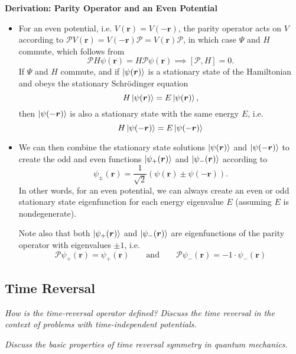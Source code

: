 \documentclass[11pt, a4paper]{article}
\newcommand{\eqtext}[1]{\qquad \text{#1} \qquad}
\newcommand{\Schro}{Schr\"{o}dinger\xspace}
\newcommand{\Ham}{Hamiltonian\xspace}
\renewcommand{\vec}[1]{\bm{#1}}  %
\renewcommand{\r}{\vec{r}}  %
\newcommand{\Par}{\mathcal{P}}  %
\newcommand{\p}{\psi}  %
\renewcommand{\P}{\Psi}  %
\renewcommand{\k}[1]{\ket{#1}}
\begin{document}
\textbf{Derivation: Parity Operator and an Even Potential}
\begin{itemize}
    \item For an even potential, i.e. $ V(\r) = V(-\r) $, the parity operator acts on $ V $ according to $ \Par V(\r) = V(-\r)\Par = V(\r)\Par $, in which case $ \P $ and $ H $ commute, which follows from
	\begin{equation*}
		\Par H\p(\r) = H \Par \p(\r) \implies [\Par, H] = 0.
	\end{equation*}
	If $ \P $ and $ H $ commute, and if $ \ket{\p(\r)} $ is a stationary state of the \Ham and obeys the stationary \Schro equation
	\begin{equation*}
		H\k{\p(\r)} = E \ket{\p(\r)},
	\end{equation*}
	then $ \ket{\p(-\r)} $ is also a stationary state with the same energy $ E $, i.e.
	\begin{equation*}
		H\k{\p(-\r)} = E \ket{\p(-\r)}
	\end{equation*}

	\item We can then combine the stationary state solutions $  \ket{\p(\r)} $ and $ \ket{\p(-\r)} $ to create the odd and even functions $  \ket{\p_{+}(\r)} $ and $ \k{\p_{-}(\r)} $ according to
	\begin{equation*}
		\p_{\pm}(\r) = \frac{1}{\sqrt{2}}\left(\p(\r) \pm \p(-\r)\right).
	\end{equation*}
	In other words, for an even potential, we can always create an even or odd stationary state eigenfunction for each energy eigenvalue $ E $ (assuming $ E $ is nondegenerate).
	
	Note also that both $  \ket{\p_{+}(\r)} $ and $ \k{\p_{-}(\r)} $ are eigenfunctions of the parity operator with eigenvalues $ \pm 1 $, i.e.
	\begin{equation*}
		\Par \p_{+}(\r) =  \p_{+}(\r) \eqtext{and} \Par \p_{-}(\r) =  -1 \cdot \p_{-}(\r)
	\end{equation*}
	
\end{itemize}

\subsection{Time Reversal}
\textit{How is the time-reversal operator defined? Discuss the time reversal in the context of problems with time-independent potentials.}

\textit{Discuss the basic properties of time reversal symmetry in quantum mechanics.}
\end{document}
